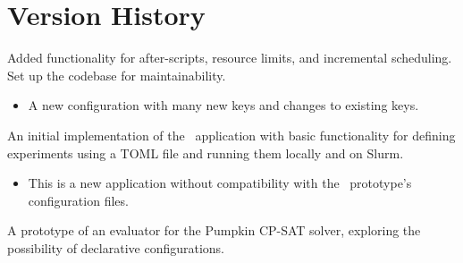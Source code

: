 \pagebreak

\section{Version History}




Added functionality for after-scripts, resource limits,
and incremental scheduling.
Set up the codebase for maintainability.

\breakingchanges
\begin{itemize}
\item A new configuration with many new keys and
changes to existing keys.
\end{itemize}


An initial implementation of the \gourdtest\ application
with basic functionality for defining experiments using a
TOML file and running them locally and on Slurm.

\breakingchanges
\begin{itemize}
\item This is a new application without compatibility with
the \gourdtest\ prototype's configuration files.
\end{itemize}


A prototype of an evaluator for the Pumpkin CP-SAT solver,
exploring the possibility of declarative configurations.
